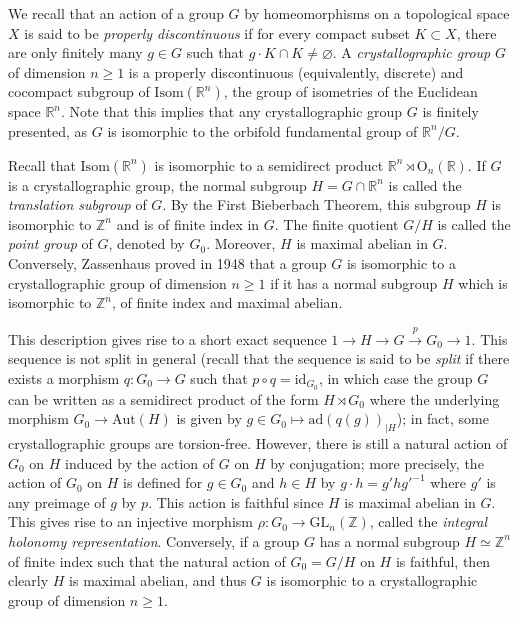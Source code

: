 \documentclass[a4paper, 11pt]{amsart}
\theoremstyle{definition}
\theoremstyle{remark}
\renewcommand{\geq}{\geqslant}
\begin{document}
We recall that an action of a group $G$ by homeomorphisms on a topological space $X$ is said to be \emph{properly discontinuous} if for every compact subset $K \subset X$, there are only finitely many $g\in G$ such that $g\cdot K \cap K \neq \varnothing$. A \emph{crystallographic group} $G$ of dimension $n\geq 1$ is a properly discontinuous (equivalently, discrete) and cocompact subgroup of $\mathrm{Isom}(\mathbb{R}^n)$, the group of isometries of the Euclidean space $\mathbb{R}^n$. Note that this implies that any crystallographic group $G$ is finitely presented, as $G$ is isomorphic to the orbifold fundamental group of $\mathbb{R}^n/G$.

Recall that $\mathrm{Isom}(\mathbb{R}^n)$ is isomorphic to a semidirect product $\mathbb{R}^n\rtimes \mathrm{O}_n(\mathbb{R})$. If $G$ is a crystallographic group, the normal subgroup $H=G\cap \mathbb{R}^n$ is called the \emph{translation subgroup} of $G$. By the First Bieberbach Theorem, this subgroup $H$ is isomorphic to $\mathbb{Z}^n$ and is of finite index in $G$. The finite quotient $G/H$ is called the \emph{point group} of $G$, denoted by $G_0$. Moreover, $H$ is maximal abelian in $G$. Conversely, Zassenhaus proved in 1948 that a group $G$ is isomorphic to a crystallographic group of dimension $n\geq 1$ if it has a normal subgroup $H$ which is isomorphic to $\mathbb{Z}^n$, of finite index and maximal abelian.




This description gives rise to a short exact sequence $1\rightarrow H\rightarrow G \overset{p}{\rightarrow} G_0\rightarrow 1$. This sequence is not split in general (recall that the sequence is said to be \emph{split} if there exists a morphism $q:G_0\rightarrow G$ such that $p\circ q=\mathrm{id}_{G_0}$, in which case the group $G$ can be written as a semidirect product of the form $H\rtimes G_0$ where the underlying morphism $G_0\rightarrow \mathrm{Aut}(H)$ is given by $g\in G_0\mapsto \mathrm{ad}(q(g))_{\vert H}$); in fact, some crystallographic groups are torsion-free. However, there is still a natural action of $G_0$ on $H$ induced by the action of $G$ on $H$ by conjugation; more precisely, the action of $G_0$ on $H$ is defined for $g\in G_0$ and $h\in H$ by $g\cdot h=g'hg'^{-1}$ where $g'$ is any preimage of $g$ by $p$. This action is faithful since $H$ is maximal abelian in $G$. This gives rise to an injective morphism $\rho:G_0\rightarrow \mathrm{GL}_n(\mathbb{Z})$, called the {\em integral holonomy representation}. Conversely, if a group $G$ has a normal subgroup $H\simeq \mathbb{Z}^n$ of finite index such that the natural action of $G_0=G/H$ on $H$ is faithful, then clearly $H$ is maximal abelian, and thus $G$ is isomorphic to a crystallographic group of dimension $n\geq 1$.
\end{document}
